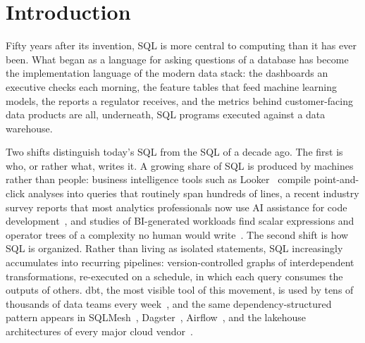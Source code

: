 
\chapter{Introduction}
\label{chap:intro}

Fifty years after its invention, SQL is more central to computing than it
has ever been. What began as a language for asking questions of a database
has become the implementation language of the modern data stack: the
dashboards an executive checks each morning, the feature tables that feed
machine learning models, the reports a regulator receives, and the metrics
behind customer-facing data products are all, underneath, SQL programs
executed against a data warehouse.

Two shifts distinguish today's SQL from the SQL of a decade ago. The first
is who, or rather what, writes it. A growing share of SQL is produced by
machines rather than people: business intelligence tools such as
Looker~\cite{lookergoogle} compile point-and-click analyses into queries
that routinely span hundreds of lines, a recent industry survey reports
that most analytics professionals now use AI assistance for code
development~\cite{dbt2025state}, and studies of BI-generated workloads
find scalar expressions and operator trees of a complexity no human would
write~\cite{getreal2018}. The second shift is how SQL is organized. Rather
than living as isolated statements, SQL increasingly accumulates into
recurring pipelines: version-controlled graphs of interdependent
transformations, re-executed on a schedule, in which each query consumes
the outputs of others. dbt, the most visible tool of this movement, is
used by tens of thousands of data teams every
week~\cite{dbtComplexity}, and the same dependency-structured pattern
appears in SQLMesh~\cite{sqlmeshOverview}, Dagster~\cite{dagsterAssets},
Airflow~\cite{airflowDags}, and the lakehouse architectures of every major
cloud vendor~\cite{databricksMedallion}.


